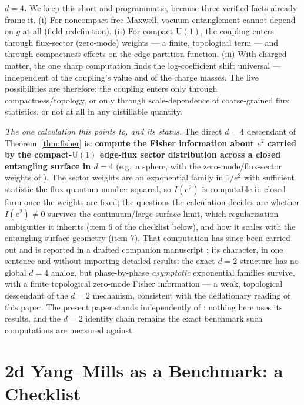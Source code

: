 \documentclass[11pt]{article}
\theoremstyle{remark}
\theoremstyle{plain}
\begin{document}
\textbf{$d = 4$.} We keep this short and programmatic, because three verified facts already frame it. (i) For noncompact free Maxwell, vacuum entanglement cannot depend on $g$ at all (field redefinition). (ii) For compact $\mathrm{U}(1)$, the coupling enters through flux-sector (zero-mode) weights --- a finite, topological term \cite{DW16} --- and through compactness effects on the edge partition function. (iii) With charged matter, the one sharp computation \cite{CHMP} finds the log-coefficient shift universal --- independent of the coupling's value and of the charge masses. The live possibilities are therefore: the coupling enters only through compactness/topology, or only through scale-dependence of coarse-grained flux statistics, or not at all in any distillable quantity.

\emph{The one calculation this points to, and its status.} The direct $d = 4$ descendant of Theorem~\ref{thm:fisher} is: \textbf{compute the Fisher information about $e^2$ carried by the compact-$\mathrm{U}(1)$ edge-flux sector distribution across a closed entangling surface in $d = 4$} (e.g.\ a sphere, with the zero-mode/flux-sector weights of \cite{DW16}). The sector weights are an exponential family in $1/e^2$ with sufficient statistic the flux quantum number squared, so $I(e^2)$ is computable in closed form once the weights are fixed; the questions the calculation decides are whether $I(e^2) \neq 0$ survives the continuum/large-surface limit, which regularization ambiguities it inherits (item 6 of the checklist below), and how it scales with the entangling-surface geometry (item 7). That computation has since been carried out and is reported in a drafted companion manuscript \cite{u1fourd}; its character, in one sentence and without importing detailed results: the exact $d = 2$ structure has no global $d = 4$ analog, but phase-by-phase \emph{asymptotic} exponential families survive, with a finite topological zero-mode Fisher information --- a weak, topological descendant of the $d = 2$ mechanism, consistent with the deflationary reading of this paper. The present paper stands independently of \cite{u1fourd}: nothing here uses its results, and the $d = 2$ identity chain remains the exact benchmark such computations are measured against.

\section{2d Yang--Mills as a Benchmark: a Checklist}\label{sec:benchmark}
\end{document}

